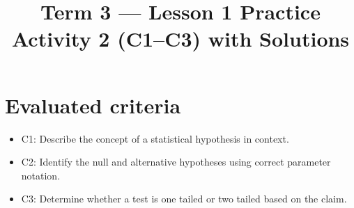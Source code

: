 \makeatletter
{}
\makeatother	



\title{Term 3 --- Lesson 1 Practice Activity 2 (C1--C3) with Solutions}
\author{}
\date{}



	\maketitle

	\setcounter{tocdepth}{1}
	\setcounter{secnumdepth}{2}
	\tableofcontents

\newcommand{\LeftTailGraph}{%
\begin{center}
\begin{tikzpicture}[scale=0.55]
\draw[thin] (-3,0) -- (3,0);
\fill[gray!35] (-3,0) -- plot[smooth,domain=-3:-1] (\x,{1.6*exp(-0.5*\x*\x)}) -- (-1,0) -- cycle;
\draw[thick,domain=-3:3,smooth] plot (\x,{1.6*exp(-0.5*\x*\x)});
\end{tikzpicture}
\end{center}
}

\newcommand{\RightTailGraph}{%
\begin{center}
\begin{tikzpicture}[scale=0.55]
\draw[thin] (-3,0) -- (3,0);
\fill[gray!35] (1,0) -- plot[smooth,domain=1:3] (\x,{1.6*exp(-0.5*\x*\x)}) -- (3,0) -- cycle;
\draw[thick,domain=-3:3,smooth] plot (\x,{1.6*exp(-0.5*\x*\x)});
\end{tikzpicture}
\end{center}
}

\newcommand{\TwoTailGraph}{%
\begin{center}
\begin{tikzpicture}[scale=0.55]
\draw[thin] (-3,0) -- (3,0);
\fill[gray!35] (-3,0) -- plot[smooth,domain=-3:-1] (\x,{1.6*exp(-0.5*\x*\x)}) -- (-1,0) -- cycle;
\fill[gray!35] (1,0) -- plot[smooth,domain=1:3] (\x,{1.6*exp(-0.5*\x*\x)}) -- (3,0) -- cycle;
\draw[thick,domain=-3:3,smooth] plot (\x,{1.6*exp(-0.5*\x*\x)});
\end{tikzpicture}
\end{center}
}

\section*{Evaluated criteria}
\begin{itemize}
\item C1: Describe the concept of a statistical hypothesis in context.
\item C2: Identify the null and alternative hypotheses using correct parameter notation.
\item C3: Determine whether a test is one tailed or two tailed based on the claim.
\end{itemize}

